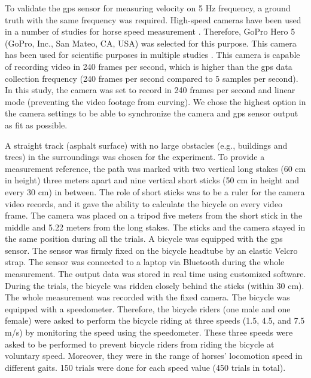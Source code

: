 To validate the \gls{gps} sensor for measuring velocity on 5 Hz frequency, a ground truth with the same frequency was required. High-speed cameras have been used in a number of studies for horse speed measurement \cite{fredricson_1980_the,ratzlaff_1985_the}. Therefore, GoPro Hero 5 (GoPro, Inc., San Mateo, CA, USA) was selected for this purpose. This camera has been used for scientific purposes in multiple studies \cite{8036783,10.1371/journal.pone.0212319,SUN2017319}. This camera is capable of recording video in 240 frames per second, which is higher than the \gls{gps} data collection frequency (240 frames per second compared to 5 samples per second). In this study, the camera was set to record in 240 frames per second and linear mode (preventing the video footage from curving). We chose the highest option in the camera settings to be able to synchronize the camera and \gls{gps} sensor output as fit as possible.

A straight track (asphalt surface) with no large obstacles (e.g., buildings and trees) in the surroundings was chosen for the experiment. To provide a measurement reference, the path was marked with two vertical long stakes (60 cm in height) three meters apart and nine vertical short sticks (50 cm in height and every 30 cm) in between. The role of short sticks was to be a ruler for the camera video records,  and it gave the ability to calculate the bicycle on every video frame. The camera was placed on a tripod five meters from the short stick in the middle and 5.22 meters from the long stakes. The sticks and the camera stayed in the same position during all the trials.
A bicycle was equipped with the \gls{gps} sensor. The sensor was firmly fixed on the bicycle headtube by an elastic Velcro strap. The sensor was connected to a laptop via Bluetooth during the whole measurement. The output data was stored in real time using customized software. During the trials, the bicycle was ridden closely behind the sticks (within 30 cm). The whole measurement was recorded with the fixed camera. The bicycle was equipped with a speedometer. Therefore, the bicycle riders (one male and one female) were asked to perform the bicycle riding at three speeds (1.5, 4.5, and 7.5 m/s) by monitoring the speed using the speedometer. These three speeds were asked to be performed to prevent bicycle riders from riding the bicycle at voluntary speed. Moreover, they were in the range of horses' locomotion speed in different gaits. 150 trials were done for each speed value (450 trials in total). 

